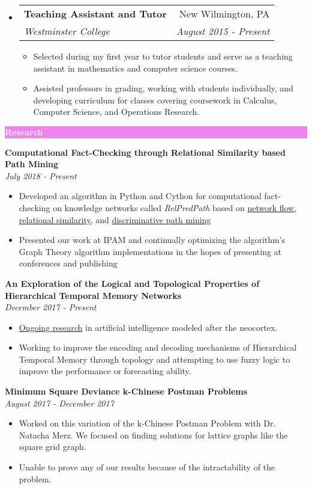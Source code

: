 \documentclass[letterpaper,11pt]{article}
\makeatletter
\newcommand{\resitem}[1]{\item #1 \vspace{-2pt}}
\newcommand{\resheading}[1]{{\large \colorbox{violet}{\begin{minipage}{\textwidth}{\textbf{#1 \vphantom{p\^{E}}}}\end{minipage}}}}
\newcommand{\ressubheading}[4]{
	\begin{tabular*}{7.0in}{l@{\extracolsep{\fill}}r}
		\textbf{#1} & #2 \\
		\textit{#3} & \textit{#4} \\
	\end{tabular*}\vspace{-6pt}}
\makeatother
\begin{document}
\begin{itemize}
\begin{itemize}
		\end{itemize}	
	\item
		\ressubheading{Teaching Assistant and Tutor}{New Wilmington, PA}{Westminster College}{August 2015 - Present}
		\begin{itemize}
			\resitem{Selected during my first year to tutor students and serve as a teaching assistant in mathematics and computer science courses.}
			\resitem{Assisted professors in grading, working with students individually, and developing curriculum for classes covering coursework in Calculus, Computer Science, and Operations Research.}
		\end{itemize}
		
	\end{itemize}
	
	\resheading{\textcolor{white}{Research}}
	
		\vspace{0.1in}
		
		\textbf{Computational Fact-Checking through Relational Similarity based Path Mining} \\	\textit{July 2018 - Present}
		\begin{itemize}[topsep=3pt, itemsep=1pt]
			\resitem{Developed an algorithm in Python and Cython for computational fact-checking on knowledge networks called \textit{RelPredPath} based on \href{https://arxiv.org/pdf/1708.07239.pdf}{network flow, relational similarity,} and \href{https://arxiv.org/pdf/1510.05911.pdf}{discriminative path mining} }
			\resitem{Presented our work at IPAM and continually optimizing the algorithm's Graph Theory algorithm implementations in the hopes of presenting at conferences and publishing}
		\end{itemize}

		\textbf{An Exploration of the Logical and Topological Properties of Hierarchical Temporal Memory Networks} \\ \textit{December 2017 - Present}
		\begin{itemize}[topsep=3pt, itemsep=1pt]
			\resitem{\href{https://github.com/alexandermichels/HonorsResearch}{Ongoing research} in artificial intelligence modeled after the neocortex.}
			\resitem{Working to improve the encoding and decoding mechanisms of Hierarchical Temporal Memory through topology and attempting to use fuzzy logic to improve the performance or forecasting ability.}
		\end{itemize}
		
		\textbf{Minimum Square Deviance k-Chinese Postman Problems} \\ \textit{August 2017 - December 2017}
		\begin{itemize}[topsep=3pt, itemsep=1pt]
			\resitem{Worked on this variation of the k-Chinese Postman Problem with Dr. Natacha Merz. We focused on finding solutions for lattice graphs like the square grid graph.}
			\resitem{Unable to prove any of our results because of the intractability of the problem.}
		\end{itemize}
\end{document}
